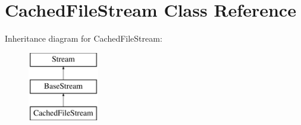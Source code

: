\hypertarget{class_cached_file_stream}{}\section{Cached\+File\+Stream Class Reference}
\label{class_cached_file_stream}
Inheritance diagram for Cached\+File\+Stream\+:\begin{figure}[H]
\begin{center}
\leavevmode
\includegraphics[height=3.000000cm]{class_cached_file_stream}
\end{center}
\end{figure}

